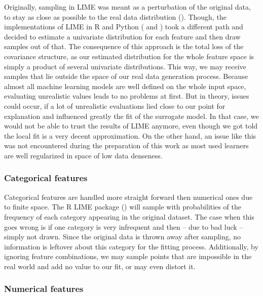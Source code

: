 \documentclass[]{krantz}
\begin{document}
Originally, sampling in LIME was meant as a perturbation of the original
data, to stay as close as possible to the real data distribution
(\citet{ribeiro2016should}). Though, the implementations of LIME in R
and Python (\citet{thomasp85lime} and \citet{marcotcrlime}) took a
different path and decided to estimate a univariate distribution for
each feature and then draw samples out of that. The consequence of this
approach is the total loss of the covariance structure, as our estimated
distribution for the whole feature space is simply a product of several
univariate distributions. This way, we may receive samples that lie
outside the space of our real data generation process. Because almost
all machine learning models are well defined on the whole input space,
evaluating unrealistic values leads to no problems at first. But in
theory, issues could occur, if a lot of unrealistic evaluations lied
close to our point for explanation and influenced greatly the fit of the
surrogate model. In that case, we would not be able to trust the results
of LIME anymore, even though we got told the local fit is a very decent
approximation. On the other hand, an issue like this was not encountered
during the preparation of this work as most used learners are well
regularized in space of low data denseness.

\subsubsection{Categorical features}\label{categorical-features-1}

Categorical features are handled more straight forward then numerical
ones due to finite space. The R LIME package (\citet{thomasp85lime})
will sample with probabilities of the frequency of each category
appearing in the original dataset. The case when this goes wrong is if
one category is very infrequent and then -- due to bad luck -- simply
not drawn. Since the original data is thrown away after sampling, no
information is leftover about this category for the fitting process.
Additionally, by ignoring feature combinations, we may sample points
that are impossible in the real world and add no value to our fit, or
may even distort it.

\subsubsection{Numerical features}\label{numerical-features}
\end{document}
